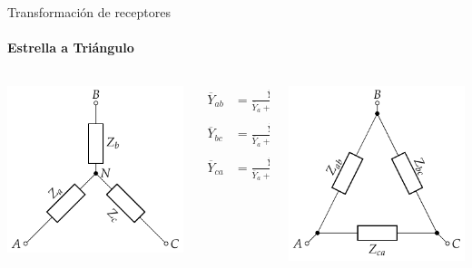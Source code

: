 \documentclass[aspectratio=169, usenames,svgnames,dvipsnames]{beamer}
\begin{document}
\begin{frame}[label={sec:orgf555c81}]{Transformación de receptores}
\framesubtitle{Estrella a Triángulo}
\begin{columns}
\begin{column}{0.3\columnwidth}
\begin{center}
\includegraphics[height=0.5\textheight]{../figs/Impedancia_Estrella.pdf}
\end{center}
\end{column}

\begin{column}{0.3\columnwidth}
\begin{align*}
  \overline{Y}_{ab} &= \frac{\overline{Y}_a \overline{Y}_b}{\overline{Y}_a + \overline{Y}_b + \overline{Y}_c}\\
  \\
  \overline{Y}_{bc} &= \frac{\overline{Y}_b \overline{Y}_c}{\overline{Y}_a + \overline{Y}_b + \overline{Y}_c}\\
  \\
  \overline{Y}_{ca} &= \frac{\overline{Y}_c \overline{Y}_a}{\overline{Y}_a + \overline{Y}_b + \overline{Y}_c}\\
\end{align*}
\end{column}
\begin{column}{0.3\columnwidth}
\begin{center}
\includegraphics[height=0.5\textheight]{../figs/Impedancia_Triangulo.pdf}
\end{center}
\end{column}
\end{columns}
\end{frame}
\end{document}
